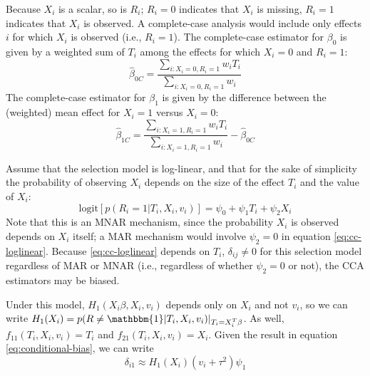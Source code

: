 \documentclass[
]{article}
\begin{document}
Because \(X_i\) is a scalar, so is \(R_i\); \(R_i = 0\) indicates that \(X_i\) is missing, \(R_i = 1\) indicates that \(X_i\) is observed.
A complete-case analysis would include only effects \(i\) for which \(X_i\) is observed (i.e., \(R_i = 1\)).
The complete-case estimator for \(\beta_0\) is given by a weighted sum of \(T_i\) among the effects for which \(X_i = 0\) and \(R_i = 1\):
\begin{equation}
\hat{\beta}_{0C} = \frac{\sum_{i: X_i = 0, R_i = 1} w_i T_i}{\sum_{i: X_i = 0, R_i = 1} w_i}
\label{eq:b0c-ex}
\end{equation}
The complete-case estimator for \(\beta_1\) is given by the difference between the (weighted) mean effect for \(X_i = 1\) versus \(X_i = 0\):
\begin{equation}
\hat{\beta}_{1C} = \frac{\sum_{i: X_i = 1, R_i = 1} w_i T_i}{\sum_{i: X_i = 1, R_i = 1} w_i} - \hat{\beta}_{0C}
\label{eq:b1c-ex}
\end{equation}

Assume that the selection model is log-linear, and that for the sake of simplicity the probability of observing \(X_i\) depends on the size of the effect \(T_i\) and the value of \(X_i\):
\begin{equation}
\text{logit}[p(R_i = 1 | T_i, X_i, v_i)] 
  = \psi_0  + \psi_1 T_i + \psi_2 X_i
\label{eq:cc-loglinear}
\end{equation}
Note that this is an MNAR mechanism, since the probability \(X_i\) is observed depends on \(X_i\) itself; a MAR mechanism would involve \(\psi_2 = 0\) in equation \eqref{eq:cc-loglinear}.
Because \eqref{eq:cc-loglinear} depends on \(T_i\), \(\delta_{ij} \neq 0\) for this selection model regardless of MAR or MNAR (i.e., regardless of whether \(\psi_2 = 0\) or not), the CCA estimators may be biased.

Under this model, \(H_{1}(X_i\beta, X_i, v_i)\) depends only on \(X_i\) and not \(v_i\), so we can write \(H_1(X_i) = p(R \neq \mathbbm{1} | T_i, X_i, v_i)\rvert_{T_i = X_i^T \beta}\).
As well, \(f_{11}(T_i, X_i, v_i) = T_i\) and \(f_{21}(T_i, X_i, v_i) = X_i\).
Given the result in equation \eqref{eq:conditional-bias}, we can write
\begin{equation}
\delta_{i1}
   \approx H_1(X_i)(v_i + \tau^2)\psi_1
\label{eq:cc-ex-delta}
\end{equation}
\end{document}
